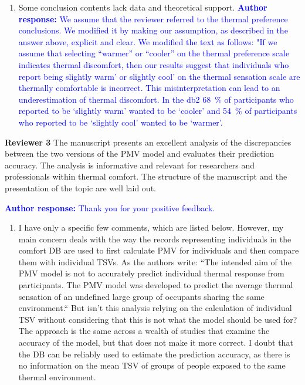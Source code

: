 \documentclass[a4paper, 10pt]{letter}
\newcommand{\response}[1]{\textcolor{blue}{\textbf{Author response:} #1}}
\begin{document}
\begin{letter}
\begin{enumerate}
            \item Some conclusion contents lack data and theoretical support.
            \response{
            We assume that the reviewer referred to the thermal preference conclusions. 
            We modified it by making our assumption, as described in the answer above, explicit and clear. 
            We modified the text as follows: "If we assume that selecting “warmer” or “cooler” on the thermal preference scale indicates thermal discomfort, then our results suggest that individuals who report being slightly warm' or slightly cool’ on the thermal sensation scale are thermally comfortable is incorrect. 
            This misinterpretation can lead to an underestimation of thermal discomfort. 
            In the \ac{db2} \qty{68}{\percent} of participants who reported to be `slightly warm' wanted to be `cooler' and \qty{54}{\percent} of participants who reported to be `slightly cool' wanted to be `warmer'.}

        \end{enumerate}

        \clearpage

        \textbf{Reviewer 3}
        The manuscript presents an excellent analysis of the discrepancies between the two versions of the PMV model and evaluates their prediction accuracy.
        The analysis is informative and relevant for researchers and professionals within thermal comfort.
        The structure of the manuscript and the presentation of the topic are well laid out.

        \response{
            Thank you for your positive feedback.
        }

        \begin{enumerate}
            \item I have only a specific few comments, which are listed below.
            However, my main concern deals with the way the records representing individuals in the comfort DB are used to first calculate PMV for individuals and then compare them with individual TSVs.
            As the authors write: ``The intended aim of the PMV model is not to accurately predict individual thermal response from participants.
            The PMV model was developed to predict the average thermal sensation of an undefined large group of occupants sharing the same environment.``
            But isn't this analysis relying on the calculation of individual TSV without considering that this is not what the model should be used for?
            The approach is the same across a wealth of studies that examine the accuracy of the model, but that does not make it more correct.
            I doubt that the DB can be reliably used to estimate the prediction accuracy, as there is no information on the mean TSV of groups of people exposed to the same thermal environment.


\end{enumerate}
\end{letter}
\end{document}
